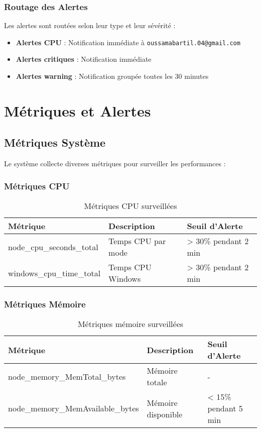 \documentclass[12pt,a4paper]{report}
\newcommand{\code}[1]{\texttt{\color{primaryblue}#1}}
\begin{document}
\subsection{Routage des Alertes}

Les alertes sont routées selon leur type et leur sévérité :

\begin{itemize}
    \item \textbf{Alertes CPU} : Notification immédiate à \code{oussamabartil.04@gmail.com}
    \item \textbf{Alertes critiques} : Notification immédiate
    \item \textbf{Alertes warning} : Notification groupée toutes les 30 minutes
\end{itemize}

\chapter{Métriques et Alertes}

\section{Métriques Système}

Le système collecte diverses métriques pour surveiller les performances :

\subsection{Métriques CPU}

\begin{table}[H]
\centering
\begin{tabular}{|l|l|l|}
\hline
\textbf{Métrique} & \textbf{Description} & \textbf{Seuil d'Alerte} \\
\hline
node\_cpu\_seconds\_total & Temps CPU par mode & > 30\% pendant 2 min \\
\hline
windows\_cpu\_time\_total & Temps CPU Windows & > 30\% pendant 2 min \\
\hline
\end{tabular}
\caption{Métriques CPU surveillées}
\label{tab:cpu-metrics}
\end{table}

\subsection{Métriques Mémoire}

\begin{table}[H]
\centering
\begin{tabular}{|l|l|l|}
\hline
\textbf{Métrique} & \textbf{Description} & \textbf{Seuil d'Alerte} \\
\hline
node\_memory\_MemTotal\_bytes & Mémoire totale & - \\
\hline
node\_memory\_MemAvailable\_bytes & Mémoire disponible & < 15\% pendant 5 min \\
\hline
\end{tabular}
\caption{Métriques mémoire surveillées}
\label{tab:memory-metrics}
\end{table}
\end{document}
